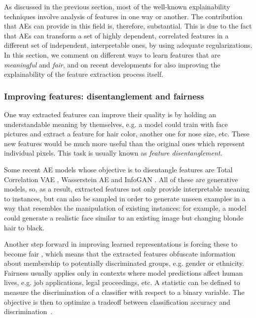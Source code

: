 As discussed in the previous section, most of the well-known explainability techniques involve analysis of features in one way or another. The contribution that AEs can provide in this field is, therefore, substantial. This is due to the fact that AEs can transform a set of highly dependent, correlated features in a different set of independent, interpretable ones, by using adequate regularizations. In this section, we comment on different ways to learn features that are \textit{meaningful} and \textit{fair}, and on recent developments for also improving the explainability of the feature extraction process itself.

\subsubsection{Improving features: disentanglement and fairness}

One way extracted features can improve their quality is by holding an understandable meaning by themselves, e.g. a model could train with face pictures and extract a feature for hair color, another one for nose size, etc. These new features would be much more useful than the original ones which represent individual pixels. This task is usually known as \textit{feature disentanglement}.

Some recent AE models whose objective is to disentangle features are Total Correlation VAE , Wasserstein AE  and InfoGAN . All of these are generative models, so, as a result, extracted features not only provide interpretable meaning to instances, but can also be sampled in order to generate unseen examples in a way that resembles the manipulation of existing instances: for example, a model could generate a realistic face similar to an existing image but changing blonde hair to black.

Another step forward in improving learned representations is forcing these to become fair , which means that the extracted features obfuscate information about membership to potentially discriminated groups, e.g. gender or ethnicity. Fairness usually applies only in contexts where model predictions affect human lives, e.g. job applications, legal proceedings, etc. A statistic can be defined to measure the discrimination of a classifier with respect to a binary variable. The objective is then to optimize a tradeoff between classification accuracy and discrimination~.

